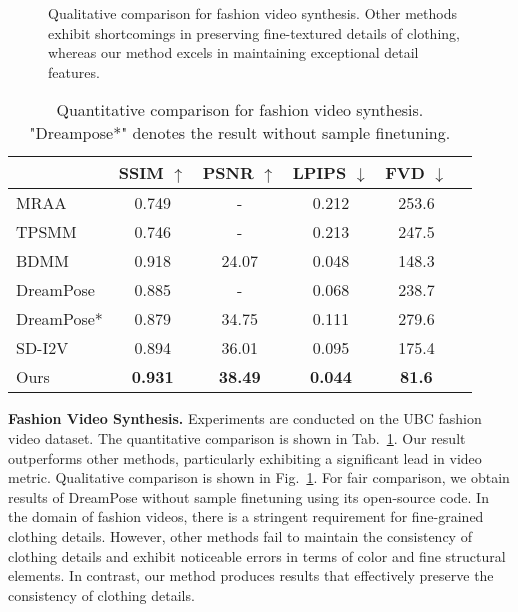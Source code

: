 \begin{figure}[!t]
\begin{center}
    \vspace{-0.3cm}
	\setlength{\fboxrule}{0pt}
\end{center}
\vspace{-0.8cm}
\caption{Qualitative comparison for fashion video synthesis. Other methods exhibit shortcomings in preserving fine-textured details of clothing, whereas our method excels in maintaining exceptional detail features.}
\vspace{-0.2cm}
\label{fig:dreampose}
\end{figure}

\begin{table}
    \setlength{\tabcolsep}{5pt}
	\centering
\begin{center}
\begin{tabular}{lccccc} 

\hline
    & SSIM $\uparrow$ & PSNR $\uparrow$ & LPIPS $\downarrow$  & FVD $\downarrow$ \\
 \hline
 MRAA\cite{mraa}     & 0.749 & - & 0.212    & 253.6 \\
 TPSMM\cite{tpsmm}    & 0.746 & - & 0.213  & 247.5 \\
 BDMM\cite{bidirectionally}     & 0.918 & 24.07 & 0.048  & 148.3 \\
DreamPose\cite{dreampose} & 0.885 & - & 0.068  & 238.7 \\
DreamPose* & 0.879 & 34.75 & 0.111  & 279.6 \\
SD-I2V & 0.894 & 36.01 & 0.095  & 175.4 \\
Ours & \textbf{0.931} & \textbf{38.49} & \textbf{0.044}  & \textbf{81.6} \\
 
\hline
\end{tabular}
\end{center}    \vspace{-0.5cm}
	\caption{Quantitative comparison for fashion video synthesis. "Dreampose*" denotes the result without sample finetuning.}
    \vspace{-0.3cm}
	\label{table:ubc}
\end{table}

\noindent
\textbf{Fashion Video Synthesis. }
Experiments are conducted on the UBC fashion video dataset. 
The quantitative comparison is shown in Tab.~\ref{table:ubc}. Our result outperforms other methods, particularly exhibiting a significant lead in video metric. Qualitative comparison is shown in Fig.~\ref{fig:dreampose}. For fair comparison, we obtain results of DreamPose without sample finetuning using its open-source code. In the domain of fashion videos, there is a stringent requirement for fine-grained clothing details. However, other methods fail to maintain the consistency of clothing details and exhibit noticeable errors in terms of color and fine structural elements. In contrast, our method produces results that effectively preserve the consistency of clothing details.

